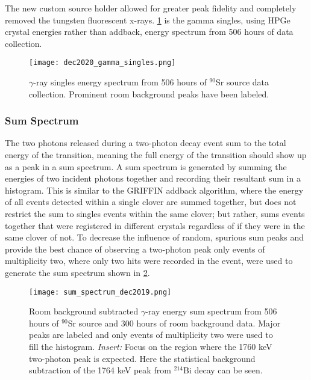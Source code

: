 \documentclass[cnatzke_thesis_proposal.tex]{subfiles}
\begin{document}
The new custom source holder allowed for greater peak fidelity and completely removed the tungsten fluorescent x-rays. 
\ref{fig:dec2020_gamma_singles} is the gamma singles, using HPGe crystal energies rather than addback, energy spectrum from 506 hours of data collection.

\begin{figure}[htbp]
  \centering
  \texttt{[image: dec2020\_gamma\_singles.png]}
  \caption{$\gamma$-ray singles energy spectrum from 506 hours of $^{90}$Sr source data collection. Prominent room background peaks have been labeled.}
  \label{fig:dec2020_gamma_singles}
\end{figure}

\subsubsection{Sum Spectrum}

The two photons released during a two-photon decay event sum to the total energy of the transition, meaning the full energy of the transition should show up as a peak in a sum spectrum. 
A sum spectrum is generated by summing the energies of two incident photons together and recording their resultant sum in a histogram.
This is similar to the GRIFFIN addback algorithm, where the energy of all events detected within a single clover are summed together, but does not restrict the sum to singles events within the same clover; but rather, sums events together that were registered in different crystals regardless of if they were in the same clover of not. 
To decrease the influence of random, spurious sum peaks and provide the best chance of observing a two-photon peak only events of multiplicity two, where only two hits were recorded in the event, were used to generate the sum spectrum shown in \ref{fig:sum_spectrum_dec2019}.

\begin{figure}[htbp]
  \centering
  \texttt{[image: sum\_spectrum\_dec2019.png]}
  \caption{Room background subtracted $\gamma$-ray energy sum spectrum from 506 hours of $^{90}$Sr source and 300 hours of room background data. Major peaks are labeled and only events of multiplicity two were used to fill the histogram. \textit{Insert:} Focus on the region where the 1760 keV two-photon peak is expected. Here the statistical background subtraction of the 1764 keV peak from $^{214}$Bi decay can be seen.}
  \label{fig:sum_spectrum_dec2019}
\end{figure}
\end{document}
